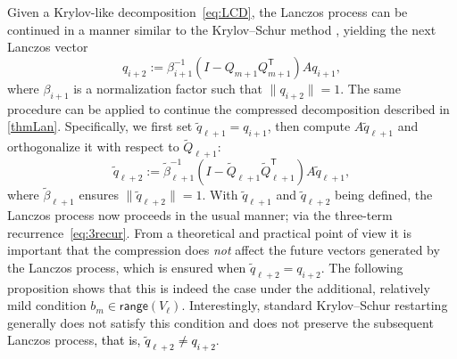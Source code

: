 \documentclass{siamart190516}
\newcommand{\Ttran}{\mathsf{T}}
\newcommand{\defi}{:=}
\newcommand{\range}{\mathsf{range}}
\providecommand{\norm}[1]{\lVert#1\rVert}
\providecommand{\edit}[1]{\textcolor{black}{#1}}
\begin{document}
Given a Krylov-like decomposition~\cref{eq:LCD}, the Lanczos process can be continued in a manner similar to the Krylov--Schur method \cite[Eq.~(2.3)]{wu2000thick}, yielding the next Lanczos vector
\begin{equation}
    \label{eq:qk2}
    q_{i+2} \defi \beta_{i+1}^{-1}(I-Q_{m+1}Q_{m+1}^{\Ttran})Aq_{i+1},    
\end{equation}
where $\beta_{i+1}$ is a normalization factor such that $\norm{q_{i+2}}=1$. The same procedure can be applied to continue the 
compressed decomposition described in \cref{thmLan}. Specifically, we first set $\widetilde{q}_{\ell+1}=q_{i+1}$, then compute $A\widetilde{q}_{\ell+1}$ and orthogonalize it with respect to $\widetilde{Q}_{\ell+1}$:
\begin{equation}
    \label{eq:ql2}
    \widetilde{q}_{\ell+2} \defi \widetilde{\beta}_{\ell+1}^{-1}(I-\widetilde{Q}_{\ell+1}\widetilde{Q}_{\ell+1}^{\Ttran})A\widetilde{q}_{\ell+1},    
\end{equation}
where $\widetilde{\beta}_{\ell+1}$ ensures $\norm{\widetilde{q}_{\ell+2}}=1$. With $\widetilde{q}_{\ell+1}$ and $\widetilde{q}_{\ell+2}$ being defined, the Lanczos process now proceeds in the usual manner; via the three-term recurrence~\cref{eq:3recur}. 
From a theoretical and practical point of view it is important that the compression does \emph{not} affect the future vectors generated by the Lanczos process, which is ensured when $\widetilde{q}_{\ell+2}=q_{i+2}$. The following proposition shows that this is indeed the case under the additional, relatively mild condition $b_{m}\in \range(V_{\ell})$. Interestingly, standard Krylov--Schur restarting generally does not satisfy this condition and does not preserve the subsequent Lanczos process\edit{, that is, $\widetilde{q}_{\ell+2}\neq q_{i+2}$}.  
\end{document}
